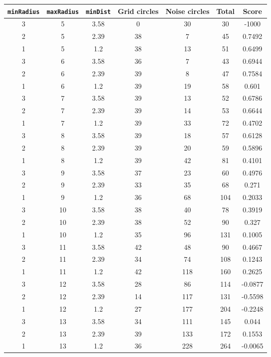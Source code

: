 \documentclass[letterpaper, 12pt]{article}
\begin{document}
\begin{longtable}{|c|c|c|c|c|c|c|}
\hline
\textbf{\texttt{minRadius}} & \textbf{\texttt{maxRadius}} & \textbf{\texttt{minDist}} & \textbf{Grid circles} & \textbf{Noise circles} & \textbf{Total} & \textbf{Score} \\
\hline
3 & 5 & 3.58 & 0 & 30 & 30 & -1000 \\
\hline
2 & 5 & 2.39 & 38 & 7 & 45 & 0.7492 \\
\hline
1 & 5 & 1.2 & 38 & 13 & 51 & 0.6499 \\
\hline
3 & 6 & 3.58 & 36 & 7 & 43 & 0.6944 \\
\hline
2 & 6 & 2.39 & 39 & 8 & 47 & 0.7584 \\
\hline
1 & 6 & 1.2 & 39 & 19 & 58 & 0.601 \\
\hline
3 & 7 & 3.58 & 39 & 13 & 52 & 0.6786 \\
\hline
2 & 7 & 2.39 & 39 & 14 & 53 & 0.6644 \\
\hline
1 & 7 & 1.2 & 39 & 33 & 72 & 0.4702 \\
\hline
3 & 8 & 3.58 & 39 & 18 & 57 & 0.6128 \\
\hline
2 & 8 & 2.39 & 39 & 20 & 59 & 0.5896 \\
\hline
1 & 8 & 1.2 & 39 & 42 & 81 & 0.4101 \\
\hline
3 & 9 & 3.58 & 37 & 23 & 60 & 0.4976 \\
\hline
2 & 9 & 2.39 & 33 & 35 & 68 & 0.271 \\
\hline
1 & 9 & 1.2 & 36 & 68 & 104 & 0.2033 \\
\hline
3 & 10 & 3.58 & 38 & 40 & 78 & 0.3919 \\
\hline
2 & 10 & 2.39 & 38 & 52 & 90 & 0.327 \\
\hline
1 & 10 & 1.2 & 35 & 96 & 131 & 0.1005 \\
\hline
3 & 11 & 3.58 & 42 & 48 & 90 & 0.4667 \\
\hline
2 & 11 & 2.39 & 34 & 74 & 108 & 0.1243 \\
\hline
1 & 11 & 1.2 & 42 & 118 & 160 & 0.2625 \\
\hline
3 & 12 & 3.58 & 28 & 86 & 114 & -0.0877 \\
\hline
2 & 12 & 2.39 & 14 & 117 & 131 & -0.5598 \\
\hline
1 & 12 & 1.2 & 27 & 177 & 204 & -0.2248 \\
\hline
3 & 13 & 3.58 & 34 & 111 & 145 & 0.044 \\
\hline
2 & 13 & 2.39 & 39 & 133 & 172 & 0.1553 \\
\hline
1 & 13 & 1.2 & 36 & 228 & 264 & -0.0065 \\

\end{longtable}
\end{document}
